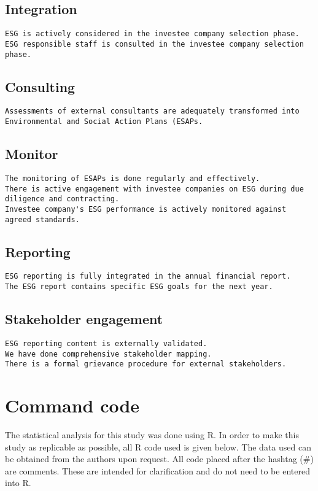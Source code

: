 \documentclass[twoside,12pt]{article}
\begin{document}
\subsection{Integration}
\begin{lstlisting}
ESG is actively considered in the investee company selection phase.
ESG responsible staff is consulted in the investee company selection phase.
\end{lstlisting}

\subsection{Consulting}
\begin{lstlisting}
Assessments of external consultants are adequately transformed into Environmental and Social Action Plans (ESAPs.
\end{lstlisting}

\subsection{Monitor}
\begin{lstlisting}
The monitoring of ESAPs is done regularly and effectively.
There is active engagement with investee companies on ESG during due diligence and contracting.
Investee company's ESG performance is actively monitored against agreed standards.
\end{lstlisting}

\subsection{Reporting}
\begin{lstlisting}
ESG reporting is fully integrated in the annual financial report.
The ESG report contains specific ESG goals for the next year.
\end{lstlisting}

\subsection{Stakeholder engagement}
\begin{lstlisting}
ESG reporting content is externally validated.
We have done comprehensive stakeholder mapping.
There is a formal grievance procedure for external stakeholders.
\end{lstlisting}


\newpage
\section{Command code}
\label{app:commandcode}
\lstset{language=R}
The statistical analysis for this study was done using R. In order to make this study as replicable as possible, all R code used is given below. The data used can be obtained from the authors upon request. All code placed after the hashtag (\#) are comments. These are intended for clarification and do not need to be entered into R.
\end{document}

